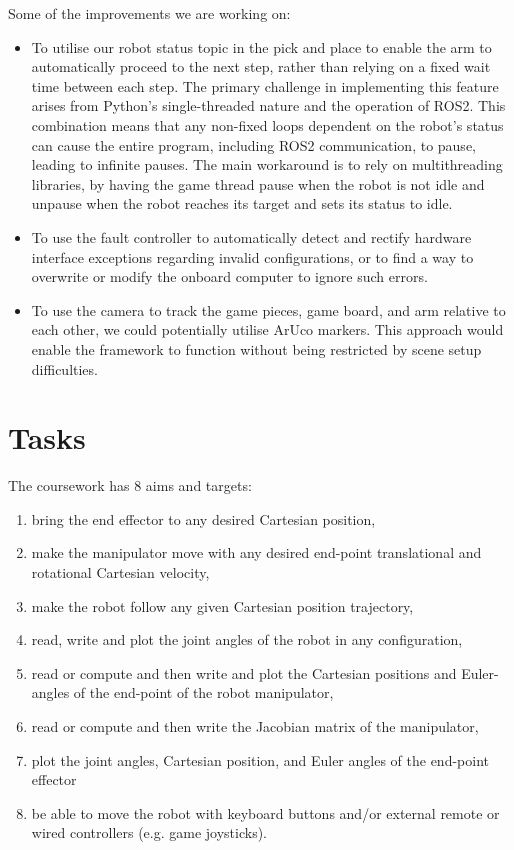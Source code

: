 \documentclass{article}
\begin{document}
Some of the improvements we are working on: 

\begin{itemize}
    \item To utilise our robot status topic in the pick and place to enable the arm to automatically proceed to the next step, rather than relying on a fixed wait time between each step. The primary challenge in implementing this feature arises from Python's single-threaded nature and the operation of ROS2. This combination means that any non-fixed loops dependent on the robot's status can cause the entire program, including ROS2 communication, to pause, leading to infinite pauses. The  main workaround is to rely on multithreading libraries, by having the game thread pause when the robot is not idle and unpause when the robot reaches its target and sets its status to idle.
    \item To use the fault controller to automatically detect and rectify hardware interface exceptions regarding invalid configurations, or to find a way to overwrite or modify the onboard computer to ignore such errors.
    \item To use the camera to track the game pieces, game board, and arm relative to each other, we could potentially utilise ArUco markers. This approach would enable the framework to function without being restricted by scene setup difficulties. 
\end{itemize}

\section{Tasks}
The coursework has 8 aims and targets:

\begin{enumerate}
    \item bring the end effector to any desired Cartesian position,
    \item make the manipulator move with any desired end-point translational and rotational Cartesian velocity,
    \item make the robot follow any given Cartesian position trajectory,
    \item read, write and plot the joint angles of the robot in any configuration,
    \item read or compute and then write and plot the Cartesian positions and Euler-angles of the end-point of the robot manipulator,
    \item read or compute and then write the Jacobian matrix of the manipulator,
    \item plot the joint angles, Cartesian position, and Euler angles of the end-point effector
    \item be able to move the robot with keyboard buttons and/or external remote or wired controllers (e.g. game joysticks).
\end{enumerate}
  
\end{document}

